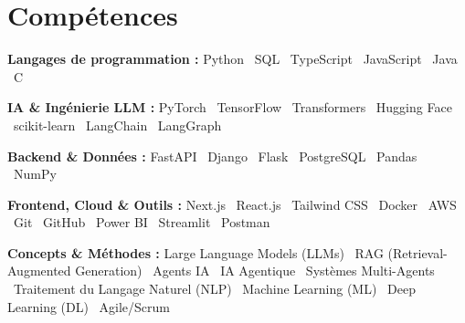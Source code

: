 \documentclass[11pt,a4paper]{article}
\begin{document}
\section{Compétences}
\textbf{\color{accent}Langages de programmation :} Python \textperiodcentered\ SQL \textperiodcentered\ TypeScript \textperiodcentered\ JavaScript \textperiodcentered\ Java \textperiodcentered\ C\par
\vspace{1.5pt}
\textbf{\color{accent}IA \& Ingénierie LLM :} PyTorch \textperiodcentered\ TensorFlow \textperiodcentered\ Transformers \textperiodcentered\ Hugging Face \textperiodcentered\ scikit-learn \textperiodcentered\ LangChain \textperiodcentered\ LangGraph\par
\vspace{1.5pt}
\textbf{\color{accent}Backend \& Données :} FastAPI \textperiodcentered\ Django \textperiodcentered\ Flask \textperiodcentered\ PostgreSQL \textperiodcentered\ Pandas \textperiodcentered\ NumPy\par
\vspace{1.5pt}
\textbf{\color{accent}Frontend, Cloud \& Outils :} Next.js \textperiodcentered\ React.js \textperiodcentered\ Tailwind CSS \textperiodcentered\ Docker \textperiodcentered\ AWS \textperiodcentered\ Git \textperiodcentered\ GitHub \textperiodcentered\ Power BI \textperiodcentered\ Streamlit \textperiodcentered\ Postman\par
\vspace{1.5pt}
\textbf{\color{accent}Concepts \& Méthodes :} Large Language Models (LLMs) \textperiodcentered\ RAG (Retrieval-Augmented Generation) \textperiodcentered\ Agents IA \textperiodcentered\ IA Agentique \textperiodcentered\ Systèmes Multi-Agents \textperiodcentered\ Traitement du Langage Naturel (NLP) \textperiodcentered\ Machine Learning (ML) \textperiodcentered\ Deep Learning (DL) \textperiodcentered\ Agile/Scrum\par
\end{document}
